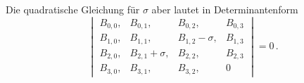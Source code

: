 \indent Die quadratische Gleichung für $\sigma$ aber lautet in Determinantenform
\[
\begin{vmatrix}
B_{0,0}, & B_{0,1}, & B_{0,2}, & B_{0,3} \\
B_{1,0}, & B_{1,1}, & B_{1,2} - \sigma, & B_{1,3} \\
B_{2,0}, & B_{2,1} + \sigma, & B_{2,2}, & B_{2,3} \\
B_{3,0}, & B_{3,1}, & B_{3,2}, & 0
\end{vmatrix} = 0\,.
\]
